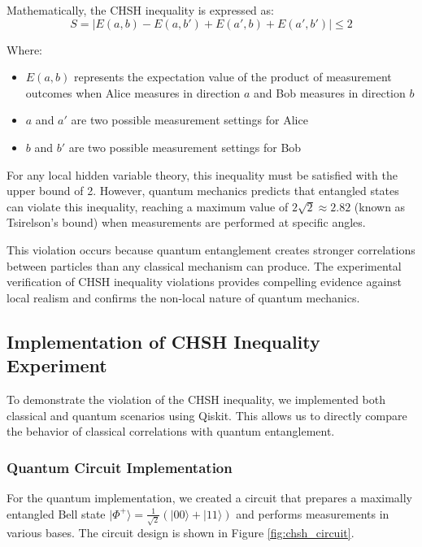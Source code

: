 \documentclass[12pt,a4paper]{article}
\begin{document}
Mathematically, the CHSH inequality is expressed as:
\begin{equation}
S = |E(a,b) - E(a,b') + E(a',b) + E(a',b')| \leq 2
\end{equation}

Where:
\begin{itemize}
    \item $E(a,b)$ represents the expectation value of the product of measurement outcomes when Alice measures in direction $a$ and Bob measures in direction $b$
    \item $a$ and $a'$ are two possible measurement settings for Alice
    \item $b$ and $b'$ are two possible measurement settings for Bob
\end{itemize}

For any local hidden variable theory, this inequality must be satisfied with the upper bound of 2. However, quantum mechanics predicts that entangled states can violate this inequality, reaching a maximum value of $2\sqrt{2} \approx 2.82$ (known as Tsirelson's bound) when measurements are performed at specific angles.

This violation occurs because quantum entanglement creates stronger correlations between particles than any classical mechanism can produce. The experimental verification of CHSH inequality violations provides compelling evidence against local realism and confirms the non-local nature of quantum mechanics.


\subsection{Implementation of CHSH Inequality Experiment}

To demonstrate the violation of the CHSH inequality, we implemented both classical and quantum scenarios using Qiskit. This allows us to directly compare the behavior of classical correlations with quantum entanglement.

\subsubsection{Quantum Circuit Implementation}

For the quantum implementation, we created a circuit that prepares a maximally entangled Bell state $|\Phi^+\rangle = \frac{1}{\sqrt{2}}(|00\rangle + |11\rangle)$ and performs measurements in various bases. The circuit design is shown in Figure \ref{fig:chsh_circuit}.
\end{document}
